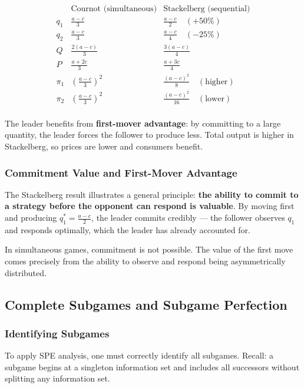 \documentclass[hidelinks]{article}
\begin{document}
\[
\begin{array}{l|ll}
 & \text{Cournot (simultaneous)} & \text{Stackelberg (sequential)} \\
\hline
q_1 & \frac{a-c}{3} & \frac{a-c}{2} \quad (+50\%) \\
q_2 & \frac{a-c}{3} & \frac{a-c}{4} \quad (-25\%) \\
Q   & \frac{2(a-c)}{3} & \frac{3(a-c)}{4} \\
P   & \frac{a+2c}{3} & \frac{a+3c}{4} \\
\pi_1 & \left(\frac{a-c}{3}\right)^2 & \frac{(a-c)^2}{8} \quad (\text{higher}) \\
\pi_2 & \left(\frac{a-c}{3}\right)^2 & \frac{(a-c)^2}{16} \quad (\text{lower}) \\
\end{array}
\]

The leader benefits from \textbf{first-mover advantage}: by committing to a large quantity, the leader forces the follower to produce less. Total output is higher in Stackelberg, so prices are lower and consumers benefit.

\subsubsection{Commitment Value and First-Mover Advantage}

The Stackelberg result illustrates a general principle: \textbf{the ability to commit to a strategy before the opponent can respond is valuable}. By moving first and producing $q_1^* = \frac{a-c}{2}$, the leader commits credibly — the follower observes $q_1$ and responds optimally, which the leader has already accounted for.

In simultaneous games, commitment is not possible. The value of the first move comes precisely from the ability to observe and respond being asymmetrically distributed.

\subsection{Complete Subgames and Subgame Perfection}

\subsubsection{Identifying Subgames}

To apply SPE analysis, one must correctly identify all subgames. Recall: a subgame begins at a singleton information set and includes all successors without splitting any information set.
\end{document}
